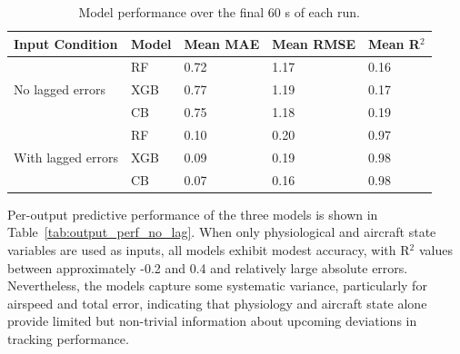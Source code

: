 \documentclass[11pt, a4paper]{article}
\begin{document}
\begin{table}[htbp]
	\caption{Model performance over the final 60 s of each run.}
	\label{tab:model_perf_across_time}
	\centering
	\small
	\begin{tabular}{p{3cm}llll}
		\toprule                                 	
		Input Condition 	&Model          	&  Mean MAE      &  Mean RMSE      & Mean R$^2$ \\ 
		\midrule
		\multirow{3}{*}{No lagged errors} &RF  & 0.72 & 1.17 & 0.16 \\
											&XGB & 0.77  	& 1.19  & 0.17 \\
											&CB   & 0.75  & 1.18 & 0.19 \\
		\midrule
		\multirow{3}{*}{With lagged errors} &RF   	& 0.10 	& 0.20 & 0.97 \\
											&XGB    & 0.09 	& 0.19 & 0.98 \\
											&CB  	& 0.07 	& 0.16 & 0.98 \\ 
		\bottomrule
	\end{tabular}
\end{table}

 Per-output predictive performance of the three models is shown in Table~\ref{tab:output_perf_no_lag}. When only physiological and aircraft state variables are used as inputs, all models exhibit modest accuracy, with R$^2$ values between approximately -0.2 and 0.4 and relatively large absolute errors. Nevertheless, the models capture some systematic variance, particularly for airspeed and total error, indicating that physiology and aircraft state alone provide limited but non-trivial information about upcoming deviations in tracking performance.
\end{document}
